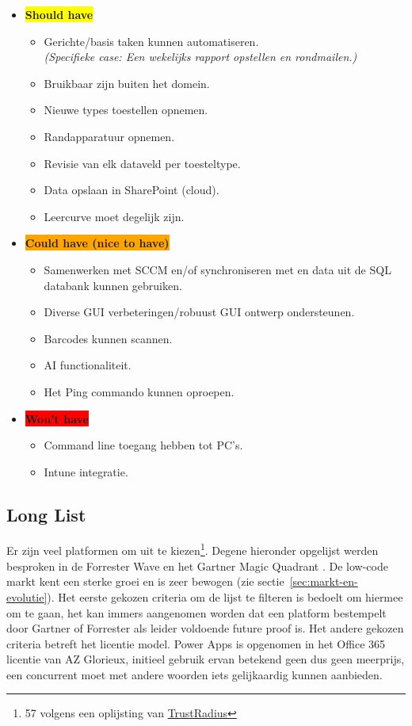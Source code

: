 \begin{itemize}
\begin{itemize}
    \end{itemize}
    \item \textbf{\colorbox{yellow}{Should have}}
    \begin{itemize}
        \item Gerichte/basis taken kunnen automatiseren.\\
        \textit{(Specifieke case: Een wekelijks rapport opstellen en rondmailen.)}
        \item Bruikbaar zijn buiten het domein.
        \item Nieuwe types toestellen opnemen.
        \item Randapparatuur opnemen.
        \item Revisie van elk dataveld per toesteltype.
        \item Data opslaan in SharePoint (cloud).
        \item Leercurve moet degelijk zijn.
    \end{itemize}
    \item \textbf{\colorbox{orange}{Could have (nice to have)}}
    \begin{itemize}
        \item Samenwerken met SCCM en/of synchroniseren met en data uit de SQL databank kunnen gebruiken.
        \item Diverse GUI verbeteringen/robuust GUI ontwerp ondersteunen.
        \item Barcodes kunnen scannen.
        \item AI functionaliteit.
        \item Het Ping commando kunnen oproepen.
    \end{itemize}
    \item \textbf{\colorbox{red}{Won't have}}
    \begin{itemize}
        \item Command line toegang hebben tot PC's.
        \item Intune integratie.
    \end{itemize}
\end{itemize}

\subsection{Long List}

Er zijn veel platformen om uit te kiezen\footnote{ 57 volgens een oplijsting van \href{https://www.trustradius.com/low-code-development}{TrustRadius}}. Degene hieronder opgelijst werden besproken in de Forrester Wave \autocite{Rymer2019} en het Gartner Magic Quadrant \autocite{Vincent2019}. De low-code markt kent een sterke groei en is zeer bewogen (zie sectie~\ref{sec:markt-en-evolutie}). Het eerste gekozen criteria om de lijst te filteren is bedoelt om hiermee om te gaan, het kan immers aangenomen worden dat een platform bestempelt door Gartner of Forrester als leider voldoende future proof is. Het andere gekozen criteria betreft het licentie model. Power Apps is opgenomen in het Office 365 licentie van AZ Glorieux, initieel gebruik ervan betekend geen dus geen meerprijs, een concurrent moet met andere woorden iets gelijkaardig kunnen aanbieden.

